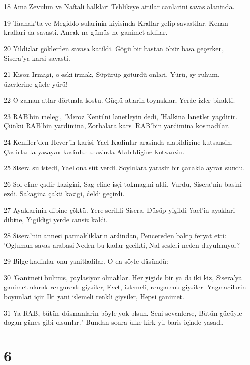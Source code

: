 \par 18 Ama Zevulun ve Naftali halklari Tehlikeye attilar canlarini savas alaninda.
\par 19 Taanak'ta ve Megiddo sularinin kiyisinda Krallar gelip savastilar. Kenan krallari da savasti. Ancak ne gümüs ne ganimet aldilar.
\par 20 Yildizlar göklerden savasa katildi. Gögü bir bastan öbür basa geçerken, Sisera'ya karsi savasti.
\par 21 Kison Irmagi, o eski irmak, Süpürüp götürdü onlari. Yürü, ey ruhum, üzerlerine güçle yürü!
\par 22 O zaman atlar dörtnala kostu. Güçlü atlarin toynaklari Yerde izler birakti.
\par 23 RAB'bin melegi, 'Meroz Kenti'ni lanetleyin dedi, 'Halkina lanetler yagdirin. Çünkü RAB'bin yardimina, Zorbalara karsi RAB'bin yardimina kosmadilar.
\par 24 Kenliler'den Hever'in karisi Yael Kadinlar arasinda alabildigine kutsansin. Çadirlarda yasayan kadinlar arasinda Alabildigine kutsansin.
\par 25 Sisera su istedi, Yael ona süt verdi. Soylulara yarasir bir çanakla ayran sundu.
\par 26 Sol eline çadir kazigini, Sag eline isçi tokmagini aldi. Vurdu, Sisera'nin basini ezdi. Sakagina çakti kazigi, deldi geçirdi.
\par 27 Ayaklarinin dibine çöktü, Yere serildi Sisera. Düsüp yigildi Yael'in ayaklari dibine, Yigildigi yerde cansiz kaldi.
\par 28 Sisera'nin annesi parmakliklarin ardindan, Pencereden bakip feryat etti: 'Oglumun savas arabasi Neden bu kadar gecikti, Nal sesleri neden duyulmuyor?
\par 29 Bilge kadinlar onu yanitladilar. O da söyle düsündü:
\par 30 'Ganimeti bulmus, paylasiyor olmalilar. Her yigide bir ya da iki kiz, Sisera'ya ganimet olarak rengarenk giysiler, Evet, islemeli, rengarenk giysiler. Yagmacilarin boyunlari için Iki yani islemeli renkli giysiler, Hepsi ganimet.
\par 31 Ya RAB, bütün düsmanlarin böyle yok olsun. Seni sevenlerse, Bütün gücüyle dogan günes gibi olsunlar." Bundan sonra ülke kirk yil baris içinde yasadi.

\chapter{6}

